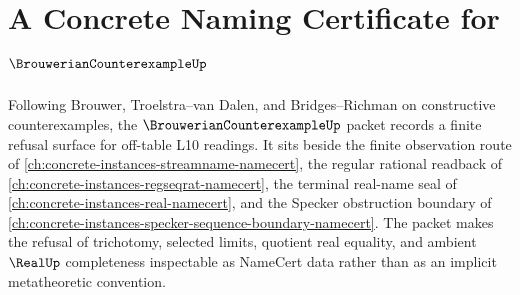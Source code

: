 \chapter{A Concrete Naming Certificate for $\BrouwerianCounterexampleUp$}
\label{ch:concrete-instances-brouwerian-counterexample-namecert}

Following Brouwer, Troelstra--van Dalen, and Bridges--Richman on constructive counterexamples, the $\BrouwerianCounterexampleUp$ packet records a finite refusal surface for off-table L10 readings. It sits beside the finite observation route of \autoref{ch:concrete-instances-streamname-namecert}, the regular rational readback of \autoref{ch:concrete-instances-regseqrat-namecert}, the terminal real-name seal of \autoref{ch:concrete-instances-real-namecert}, and the Specker obstruction boundary of \autoref{ch:concrete-instances-specker-sequence-boundary-namecert}. The packet makes the refusal of trichotomy, selected limits, quotient real equality, and ambient $\RealUp$ completeness inspectable as NameCert data rather than as an implicit metatheoretic convention.


